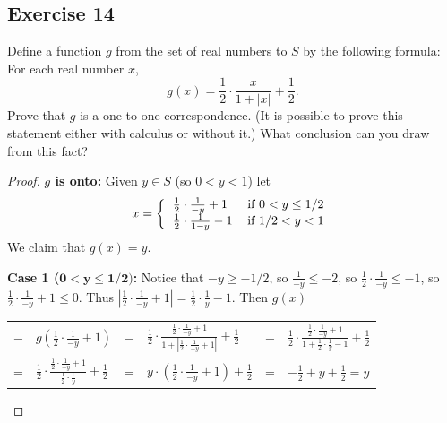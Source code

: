 \documentclass[14pt]{extarticle}
\newcommand{\dps}{\displaystyle}
\begin{document}
\subsection{Exercise 14}
Define a function $g$ from the set of real numbers to $S$ by the following formula: For each real number $x$,
\[
g(x) = \frac{1}{2} \cdot \frac{x}{1 + |x|} + \frac{1}{2}.
\]
Prove that $g$ is a one-to-one correspondence. (It is possible to prove this statement either with calculus or 
without it.) What conclusion can you draw from this fact?

\begin{proof}
{\bf $g$ is onto:} Given \(y \in S\) (so \(0 < y < 1\)) let
\[
x =
\left\{
\begin{tabular}{ll}
\(\frac{1}{2} \cdot \frac{1}{-y} + 1\) & if \(0 < y \leq 1/2\) \\
\(\frac{1}{2} \cdot \frac{1}{1-y} - 1\) & if \(1/2 < y < 1\)
\end{tabular}
\right.
\]
We claim that \(g(x) = y\).

{\bf Case 1 (\(\bm{0 < y \leq 1/2})\):} Notice that \(-y \geq -1/2\), so \(\frac{1}{-y} \leq -2\), so \(\frac{1}{2} 
\cdot \frac{1}{-y} \leq -1\), so \(\frac{1}{2} \cdot \frac{1}{-y} + 1 \leq 0\). Thus \(\left|\frac{1}{2} \cdot 
\frac{1}{-y} + 1 \right| = \frac{1}{2} \cdot \frac{1}{y} - 1\). Then $g(x)$
\begin{center}
\begin{tabular}{llllll}
= & \(\dps g\left(\frac{1}{2} \cdot \frac{1}{-y} + 1\right)\) & = & \(\dps \frac{1}{2} \cdot \frac{\frac{1}{2} \cdot 
\frac{1}{-y} + 1}{1 + \left|\frac{1}{2} \cdot \frac{1}{-y} + 1 \right|} + \frac{1}{2}\) & = & \(\dps \frac{1}{2} \cdot 
\frac{\frac{1}{2} \cdot \frac{1}{-y} + 1}{1 + \frac{1}{2} \cdot \frac{1}{y} - 1} + \frac{1}{2}\) \\
= & \(\dps \frac{1}{2} \cdot \frac{\frac{1}{2}\cdot\frac{1}{-y} + 1}{\frac{1}{2} \cdot \frac{1}{y}} + \frac{1}{2}\) & 
= & \(\dps y \cdot \left(\frac{1}{2}\cdot\frac{1}{-y} + 1\right) + \frac{1}{2}\) & = & \(\dps -\frac{1}{2} + y + 
\frac{1}{2} = y\)
\end{tabular}
\end{center}


\end{proof}
\end{document}
